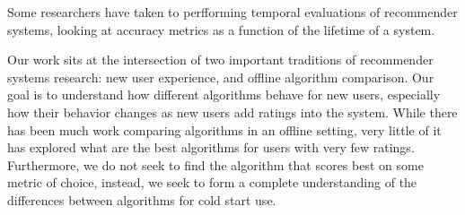 \documentclass[letterpaper]{sig-alternate}
\begin{document}
  Some researchers have taken to perfforming temporal evaluations of recommender systems, looking at accuracy metrics as a function of the lifetime of a system.
  




  Our work sits at the intersection of two important traditions of recommender systems research: new user experience, and offline algorithm comparison.
  Our goal is to understand how different algorithms behave for new users, especially how their behavior changes as new users add ratings into the system.
  While there has been much work comparing algorithms in an offline setting, very little of it has explored what are the best algorithms for users with very few ratings.
  Furthermore, we do not seek to find the algorithm that scores best on some metric of choice, instead, we seek to form a complete understanding of the differences between algorithms for cold start use.
\end{document}
